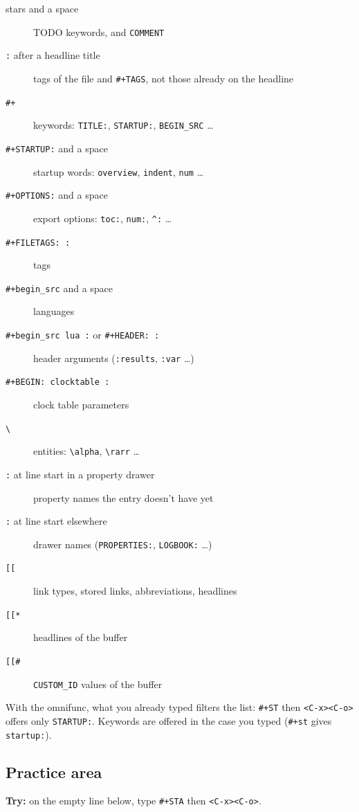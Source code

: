 \begin{description}
\item[{stars and a space}] TODO keywords, and \texttt{COMMENT}
\item[{\texttt{:} after a headline title}] tags of the file and \texttt{\#+TAGS}, not those
already on the headline
\item[{\texttt{\#+}}] keywords: \texttt{TITLE:}, \texttt{STARTUP:}, \texttt{BEGIN\_SRC} \ldots{}
\item[{\texttt{\#+STARTUP:} and a space}] startup words: \texttt{overview}, \texttt{indent}, \texttt{num} \ldots{}
\item[{\texttt{\#+OPTIONS:} and a space}] export options: \texttt{toc:}, \texttt{num:}, \texttt{\textasciicircum{}:} \ldots{}
\item[{\texttt{\#+FILETAGS: :}}] tags
\item[{\texttt{\#+begin\_src} and a space}] languages
\item[{\texttt{\#+begin\_src lua :} or \texttt{\#+HEADER: :}}] header arguments (\texttt{:results}, \texttt{:var}
\ldots{})
\item[{\texttt{\#+BEGIN: clocktable :}}] clock table parameters
\item[{\texttt{\textbackslash{}}}] entities: \texttt{\textbackslash{}alpha}, \texttt{\textbackslash{}rarr} \ldots{}
\item[{\texttt{:} at line start in a property drawer}] property names the entry doesn't
have yet
\item[{\texttt{:} at line start elsewhere}] drawer names (\texttt{PROPERTIES:}, \texttt{LOGBOOK:} \ldots{})
\item[{\texttt{[[}}] link types, stored links, abbreviations, headlines
\item[{\texttt{[[*}}] headlines of the buffer
\item[{\texttt{[[\#}}] \texttt{CUSTOM\_ID} values of the buffer
\end{description}

With the omnifunc, what you already typed filters the list: \texttt{\#+ST} then
\texttt{<C-x><C-o>} offers only \texttt{STARTUP:}. Keywords are offered in the case you
typed (\texttt{\#+st} gives \texttt{startup:}).
\subsection{Practice area}
\label{sec:org15303e2}
\textbf{Try:} on the empty line below, type \texttt{\#+STA} then \texttt{<C-x><C-o>}.

